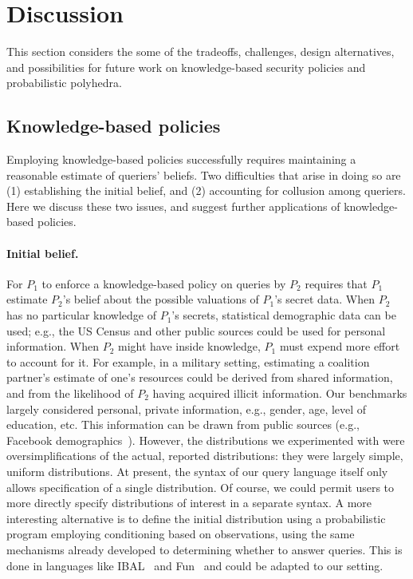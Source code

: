 \section{Discussion}
\label{sec:future-work}

This section considers the some of the tradeoffs, challenges, design
alternatives, and possibilities for future work on knowledge-based
security policies and probabilistic polyhedra.

\subsection{Knowledge-based policies}

Employing knowledge-based policies successfully requires maintaining a
reasonable estimate of queriers' beliefs.  Two difficulties that arise
in doing so are (1) establishing the initial belief, and (2)
accounting for collusion among queriers.  Here we discuss
these two issues, and suggest further applications of knowledge-based
policies.

\paragraph*{Initial belief.}

For $P_1$ to enforce a knowledge-based policy on queries by $P_2$
requires that $P_1$ estimate $P_2$'s belief about the possible
valuations of $P_1$'s secret data.  When $P_2$ has no particular
knowledge of $P_1$'s secrets, statistical demographic data can be
used; e.g., the US Census and other public sources could be used for
personal information. When $P_2$ might have inside knowledge, $P_1$
must expend more effort to account for it.  For example, in a military
setting, estimating a coalition partner's estimate of one's resources
could be derived from shared information, and from the likelihood of
$P_2$ having acquired illicit information.  
Our benchmarks largely considered personal, private information, e.g.,
gender, age, level of education, etc.  This information can be drawn
from public sources (e.g., Facebook
demographics~\cite{facebook-demographics}).  However, the
distributions we experimented with were oversimplifications of the
actual, reported distributions: they were largely simple, uniform
distributions.  At present, the syntax of our query language
itself only allows specification of a single distribution. 
Of course, we could permit users to more directly specify
distributions of interest in a separate syntax.  A more interesting
alternative is to define the initial distribution using a
probabilistic program employing conditioning based on observations,
using the same mechanisms already developed to determining whether to
answer queries.  This is done in languages like IBAL~\cite{pfeffer07ibal} and
Fun~\cite{borgstrom11measure} and could be adapted to our setting.

